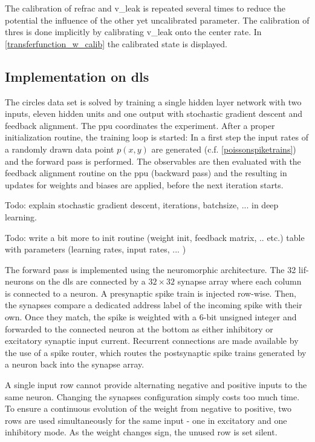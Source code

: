 The calibration of \gls{refrac} and \gls{v_leak} is repeated several times to reduce the potential the influence of the other yet uncalibrated parameter. The calibration of \gls{thres} is done implicitly by calibrating \gls{v_leak} onto the center rate. In \cref{transferfunction_w_calib} the calibrated state is displayed. 

\subsection{Implementation on \gls{dls}}

The circles data set is solved by training a single hidden layer network with two inputs, eleven hidden units and one output with stochastic gradient descent and feedback alignment. The \gls{ppu} coordinates the experiment. After a proper initialization routine, the training loop is started: In a first step the input rates of a randomly drawn data point $p(x,y)$ are generated (c.f. \cref{poissonspiketrains}) and the forward pass is performed. The observables are then evaluated with the feedback alignment routine on the \gls{ppu} (backward pass) and the resulting in updates for weights and biases are applied, before the next iteration starts.

Todo: explain stochastic gradient descent, iterations, batchsize, ... in deep learning.

Todo: write a bit more to init routine (weight init, feedback matrix, .. etc.)
table with parameters (learning rates, input rates, ... )

The forward pass is implemented using the neuromorphic architecture. The 32 \gls{lif}-neurons on the \gls{dls} are connected by a $32 \times 32$ synapse array where each column is connected to a neuron. A presynaptic spike train is injected row-wise. Then, the synapses compare a dedicated address label of the incoming spike with their own. Once they match, the spike is weighted with a 6-bit unsigned integer and forwarded to the connected neuron at the bottom as either inhibitory or excitatory synaptic input current. Recurrent connections are made available by the use of a spike router, which routes the postsynaptic spike trains generated by a neuron back into the synapse array.

A single input row cannot provide alternating negative and positive inputs to the same neuron. Changing the synapses configuration simply costs too much time. To ensure a continuous evolution of the weight from negative to positive, two rows are used simultaneously for the same input - one in excitatory and one inhibitory mode. As the weight changes sign, the unused row is set silent.

